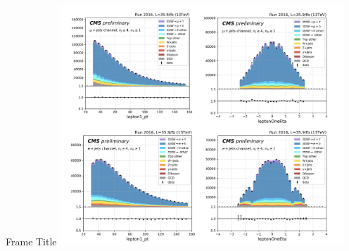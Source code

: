 \begin{frame}{Frame Title}
    \includegraphics[width=0.8\textwidth]{chapters/Analysis/sectionBackground/figures/ljets_application/mcNorm_ddShape.png}
    
\end{frame}






